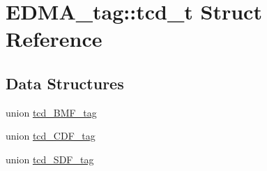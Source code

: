\hypertarget{structEDMA__tag_1_1tcd__t}{}\section{E\+D\+M\+A\+\_\+tag\+::tcd\+\_\+t Struct Reference}
\label{structEDMA__tag_1_1tcd__t}
\subsection*{Data Structures}
\begin{DoxyCompactItemize}
\item 
union \mbox{\hyperlink{unionEDMA__tag_1_1tcd__t_1_1tcd__BMF__tag}{tcd\+\_\+\+B\+M\+F\+\_\+tag}}
\item 
union \mbox{\hyperlink{unionEDMA__tag_1_1tcd__t_1_1tcd__CDF__tag}{tcd\+\_\+\+C\+D\+F\+\_\+tag}}
\item 
union \mbox{\hyperlink{unionEDMA__tag_1_1tcd__t_1_1tcd__SDF__tag}{tcd\+\_\+\+S\+D\+F\+\_\+tag}}
\end{DoxyCompactItemize}
